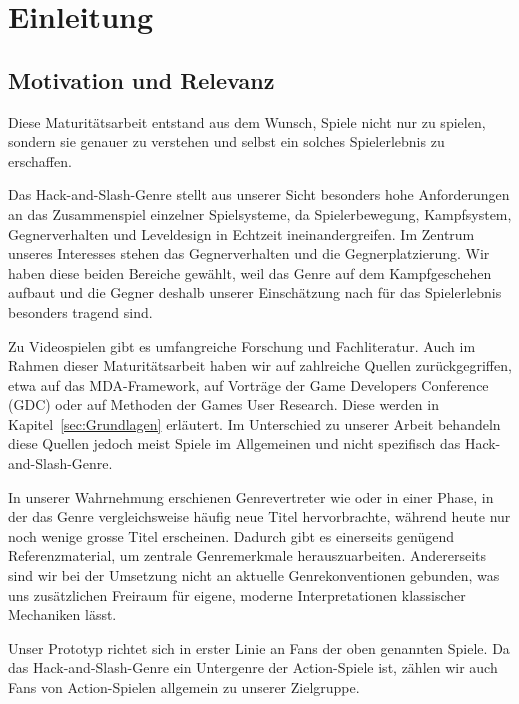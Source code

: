 \documentclass[../Main.tex]{subfiles}
\begin{document}
\section{Einleitung}

\subsection{Motivation und Relevanz}

Diese Maturitätsarbeit entstand aus dem Wunsch, Spiele nicht nur zu spielen, sondern sie genauer zu verstehen und selbst ein solches Spielerlebnis zu erschaffen.

Das Hack-and-Slash-Genre stellt aus unserer Sicht besonders hohe Anforderungen an das Zusammenspiel einzelner Spielsysteme, da Spielerbewegung, Kampfsystem, Gegnerverhalten und Leveldesign in Echtzeit ineinandergreifen. Im Zentrum unseres Interesses stehen das Gegnerverhalten und die Gegnerplatzierung. Wir haben diese beiden Bereiche gewählt, weil das Genre auf dem Kampfgeschehen aufbaut und die Gegner deshalb unserer Einschätzung nach für das Spielerlebnis besonders tragend sind.

Zu Videospielen gibt es umfangreiche Forschung und Fachliteratur. Auch im Rahmen dieser Maturitätsarbeit haben wir auf zahlreiche Quellen zurückgegriffen, etwa auf das MDA-Framework\autocite{hunicke2004mda}, auf Vorträge der Game Developers Conference (GDC)\autocite{gdc_tenprinciples2010,gdc_leveldesignaday2020,gdc_movingmountains2020,gdc_horizonquests2018} oder auf Methoden der Games User Research\autocite{drachen2018gamesuserresearch}. Diese werden in Kapitel~\ref{sec:Grundlagen} erläutert. Im Unterschied zu unserer Arbeit behandeln diese Quellen jedoch meist Spiele im Allgemeinen und nicht spezifisch das Hack-and-Slash-Genre.

In unserer Wahrnehmung erschienen Genrevertreter wie \autocite{koeitechmo_ninjagaiden_2012} oder \autocite{platinumgames_nierautomata_2017} in einer Phase, in der das Genre vergleichsweise häufig neue Titel hervorbrachte, während heute nur noch wenige grosse Titel erscheinen. Dadurch gibt es einerseits genügend Referenzmaterial, um zentrale Genremerkmale herauszuarbeiten. Andererseits sind wir bei der Umsetzung nicht an aktuelle Genrekonventionen gebunden, was uns zusätzlichen Freiraum für eigene, moderne Interpretationen klassischer Mechaniken lässt.

Unser Prototyp richtet sich in erster Linie an Fans der oben genannten Spiele. Da das Hack-and-Slash-Genre ein Untergenre der Action-Spiele ist, zählen wir auch Fans von Action-Spielen allgemein zu unserer Zielgruppe.
\end{document}
